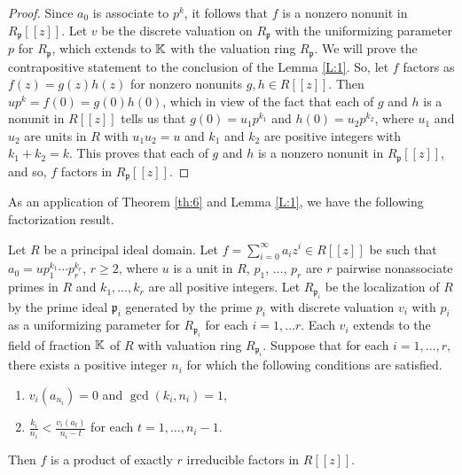 \documentclass[12pt,reqno]{amsart}%
\begin{document}
\begin{proof} Since $a_0$ is associate to $p^k$, it follows that $f$ is a nonzero nonunit in $R_{\mathfrak{p}}[[z]]$. Let $v$ be the discrete valuation on $R_{\mathfrak{p}}$ with the uniformizing parameter $p$ for $R_{\mathfrak{p}}$, which extends to $\mathbb{K}$ with the valuation ring $R_{\mathfrak{p}}$. We will prove the contrapositive statement to the conclusion of the Lemma \ref{L:1}. So, let $f$ factors as $f(z)=g(z)h(z)$ for nonzero nonunits $g,h\in R[[z]]$. Then $up^k=f(0)=g(0)h(0)$, which in view of the fact that each of $g$ and $h$ is a nonunit in $R[[z]]$ tells us that $g(0)=u_1p^{k_1}$ and $h(0)=u_2p^{k_2}$, where $u_1$ and $u_2$ are units in $R$ with $u_1u_2=u$ and $k_1$ and $k_2$ are positive integers with $k_1+k_2=k$. This proves that each of $g$ and $h$ is a nonzero nonunit in $R_{\mathfrak{p}}[[z]]$, and so, $f$ factors in $R_{\mathfrak{p}}[[z]]$.
\end{proof}
As an application of Theorem \ref{th:6} and Lemma \ref{L:1}, we have the following factorization result.
\begin{theorem}\label{th:8}
Let $R$ be a principal ideal domain. Let $f=\sum_{i=0}^\infty a_iz^i\in R[[z]]$ be such that $a_0=up_1^{k_1}\cdots p_r^{k_r}$, $r\geq 2$, where $u$ is a unit in $R$, $p_1$, $\ldots$, $p_r$ are $r$ pairwise nonassociate primes in $R$ and $k_1,\ldots,k_r$ are all positive integers. Let $R_{\mathfrak{p}_i}$ be the localization of $R$ by the prime ideal $\mathfrak{p}_i$ generated by the prime $p_i$ with discrete valuation $v_i$ with $p_i$ as a uniformizing parameter for $R_{\mathfrak{p}_i}$ for each $i=1,\ldots r$. Each $v_i$ extends to the field of fraction $\mathbb{K}$ of $R$ with valuation ring $R_{\mathfrak{p}_i}$. Suppose that for each $i=1,\ldots, r$, there exists  a positive integer $n_i$ for which the following conditions are satisfied.
\begin{enumerate}
\item[(i)] $v_{i}(a_{n_i})=0$ and $\gcd(k_i,n_i)=1$,
\item[(ii)] $\frac{k_i}{n_i}<\frac{v_{i}(a_t)}{n_i-t}$ for each $t=1,\ldots,n_i-1$.
\end{enumerate}
Then $f$ is a product of exactly $r$ irreducible factors in $R[[z]]$.
\end{theorem}
\end{document}
